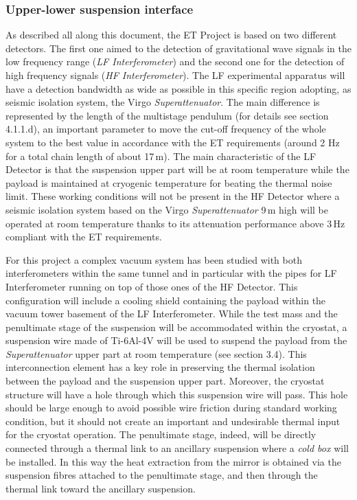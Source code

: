 \subsubsection{Upper-lower suspension interface}
\label{Upper_lower_suspension_interface}

As described all along this document, the ET Project is based on two different detectors. The first one aimed to the detection of gravitational wave signals in the low frequency range (\emph{LF Interferometer}) and the second one for the detection of high frequency signals (\emph{HF Interferometer}). The LF experimental apparatus will have a detection bandwidth as wide as possible in this specific region adopting, as seismic isolation system, the Virgo \emph{Superattenuator}. The main difference is represented by the length of the multistage pendulum (for details see section 4.1.1.d), an important parameter to move the cut-off frequency of the whole system to the best value in accordance with the ET requirements (around 2 Hz for a total chain length of about 17\,m).
The main characteristic of the LF Detector is that the suspension upper part will be at room temperature while the payload is maintained at cryogenic temperature for beating the thermal noise limit. These working conditions will not be present in the HF Detector where a seismic isolation system based on the Virgo \emph{Superattenuator} 9\,m high will be operated at room temperature thanks to its attenuation performance above 3\,Hz compliant with the ET requirements. 

For this project a complex vacuum system has been studied with both interferometers within the same tunnel and in particular with the pipes for LF Interferometer running on top of those ones of the HF Detector. This configuration will include a cooling shield containing the payload within the vacuum tower basement of the LF Interferometer. While the test mass and the penultimate stage of the suspension will be accommodated within the cryostat, a suspension wire made of Ti-6Al-4V will be used to suspend the payload from the \emph{Superattenuator} upper part at room temperature (see section 3.4). This interconnection element has a key role in preserving the thermal isolation between the payload and the suspension upper part. Moreover, the cryostat structure will have a hole through which this suspension wire will pass. This hole should be large enough to avoid possible wire friction during standard working condition, but it should not create an important and undesirable thermal input for the cryostat operation. The penultimate stage, indeed, will be directly connected through a thermal link to an ancillary suspension where a \emph{cold box} will be installed. In this way the heat extraction from the mirror is obtained via the suspension fibres attached to the penultimate stage, and then through the thermal link toward the ancillary suspension.


